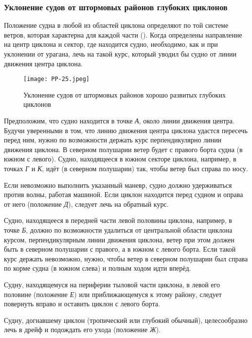 \subsubsection{Уклонение судов от штормовых районов глубоких циклонов}

Положение судна в любой из областей циклона определяют по той системе
ветров, которая характерна для каждой части (). Когда
определены направление на центр циклона и сектор, где находится судно,
необходимо, как и при уклонении от урагана, лечь на такой курс,
который уводил бы судно от линии движения центра циклона.

\begin{figure}[htb]
  \centering{}
  \texttt{[image: PP-25.jpeg]}
  \caption{Уклонение судов от штормовых районов хорошо развитых глубоких циклонов}
  \label{fig:pp25}
  \small
  \centering{}
\end{figure}

Предположим, что судно находится в точке \textit{А}, около линии
движения центра. Будучи уверенными в том, что линию движения центра
циклона удастся пересечь перед ним, нужно по возможности держать курс
перпендикулярно линии движения циклона. В северном полушарии ветер
будет с правого борта судна (в южном с левого). Судно, находящееся в
южном секторе циклона, например, в точках \textit{Г} и \textit{К},
идёт (в северном полушарии) так, чтобы ветер был справа по носу.

Если невозможно выполнить указанный маневр, судно должно удерживаться
против волны, работая машиной. Если циклон находится перед судном и
оправа от него (положение \textit{Д}), следует лечь на обратный курс.

Судно, находящееся в передней части левой половины циклона, например,
в точке \textit{Б}, должно по возможности удалиться от центральной области
циклона курсом, перпендикулярным линии движения циклона, ветер при
этом должен быть в северном полушарии с правого, а в южном с левого
борта. Если такой курс держать невозможно, нужно, чтобы ветер в
северном полушарии был справа по корме судна (в южном слева) и полным
ходом идти вперёд.

Судну, находящемуся на периферии тыловой части циклона, в левой его
половине (положение \textit{Е}) или приближающемуся к этому району, следует
повернуть вправо и оставить циклон с левого борта.

Судну, догнавшему циклон (тропический или глубокий обычный),
целесообразно лечь в дрейф и подождать его ухода (положение \textit{Ж}).

